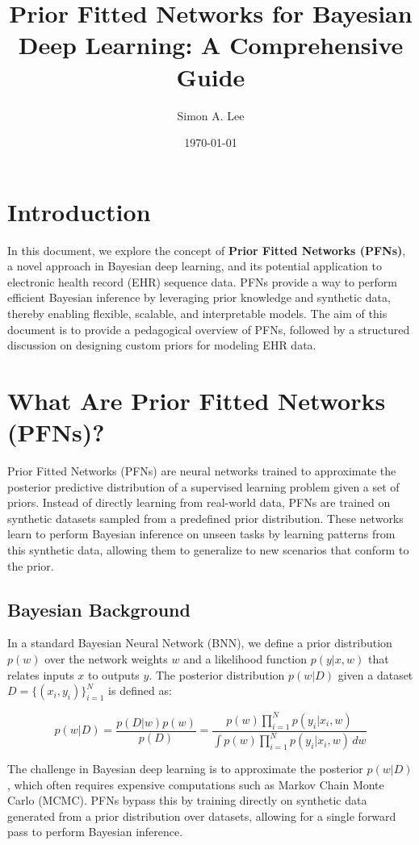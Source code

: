 \documentclass{article}
\title{Prior Fitted Networks for Bayesian Deep Learning: A Comprehensive Guide}
\author{Simon A. Lee}
\date{\today}
\begin{document}
\maketitle

\section{Introduction}

In this document, we explore the concept of \textbf{Prior Fitted Networks (PFNs)}, a novel approach in Bayesian deep learning, and its potential application to electronic health record (EHR) sequence data. PFNs provide a way to perform efficient Bayesian inference by leveraging prior knowledge and synthetic data, thereby enabling flexible, scalable, and interpretable models. The aim of this document is to provide a pedagogical overview of PFNs, followed by a structured discussion on designing custom priors for modeling EHR data.

\section{What Are Prior Fitted Networks (PFNs)?}

Prior Fitted Networks (PFNs) are neural networks trained to approximate the posterior predictive distribution of a supervised learning problem given a set of priors. Instead of directly learning from real-world data, PFNs are trained on synthetic datasets sampled from a predefined prior distribution. These networks learn to perform Bayesian inference on unseen tasks by learning patterns from this synthetic data, allowing them to generalize to new scenarios that conform to the prior.

\subsection{Bayesian Background}

In a standard Bayesian Neural Network (BNN), we define a prior distribution \( p(w) \) over the network weights \( w \) and a likelihood function \( p(y|x, w) \) that relates inputs \( x \) to outputs \( y \). The posterior distribution \( p(w|D) \) given a dataset \( D = \{(x_i, y_i)\}_{i=1}^N \) is defined as:

\[
p(w|D) = \frac{p(D|w)p(w)}{p(D)} = \frac{p(w) \prod_{i=1}^N p(y_i|x_i, w)}{\int p(w) \prod_{i=1}^N p(y_i|x_i, w) \, dw}
\]

The challenge in Bayesian deep learning is to approximate the posterior \( p(w|D) \), which often requires expensive computations such as Markov Chain Monte Carlo (MCMC). PFNs bypass this by training directly on synthetic data generated from a prior distribution over datasets, allowing for a single forward pass to perform Bayesian inference.
\end{document}
